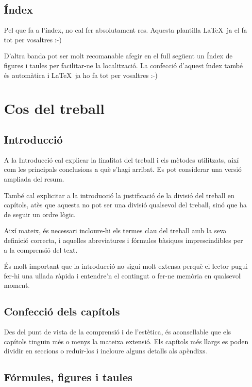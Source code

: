 \subsection{Índex}

Pel que fa a l'índex, no cal fer absolutament res. Aquesta plantilla \LaTeX \ ja el fa tot per vosaltres :-)

D'altra banda pot ser molt recomanable afegir en el full següent un Índex de figures i taules per facilitar-ne la localització. La confecció d'aquest índex també és automàtica i  \LaTeX \ ja ho fa tot per vosaltres :-)

  
\section{Cos del treball}

\subsection{Introducció}

A la Introducció cal explicar la finalitat del treball i els mètodes utilitzats, així com les principals conclusions a què s'hagi arribat. Es pot considerar una versió ampliada del resum.

També cal explicitar a la introducció la justificació de la divisió del treball en capítols, atès que aquesta no pot ser una divisió qualsevol del treball, sinó que ha de seguir un ordre lògic.

Així mateix, és necessari incloure-hi els termes clau del treball amb la seva definició correcta, i aquelles abreviatures i fórmules bàsiques imprescindibles per a la comprensió del text.

És molt important que la introducció no sigui molt extensa perquè el lector pugui fer-hi una ullada ràpida i entendre'n el contingut o fer-ne memòria en qualsevol moment.


\subsection{Confecció dels capítols}

Des del punt de vista de la comprensió i de l'estètica, és aconsellable que els capítols tinguin més o menys la mateixa extensió. Els capítols més llargs es poden dividir en seccions o reduir-los i incloure alguns detalls als apèndixs.


\subsection{Fórmules, figures i taules}

